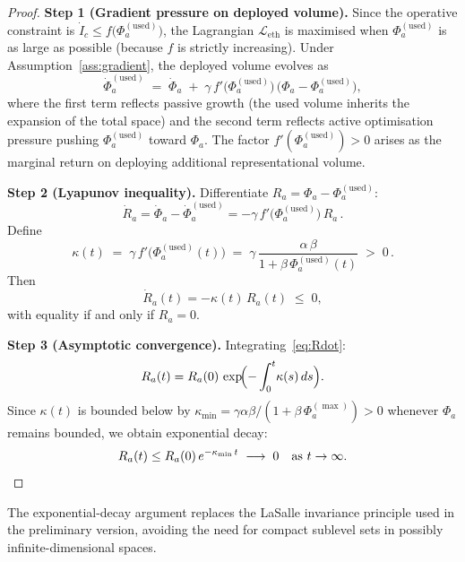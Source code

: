 \begin{proof}
\textbf{Step 1 (Gradient pressure on deployed volume).}
Since the operative constraint is
$\dot{I}_c\leq f\bigl(\Phi_a^{(\mathrm{used})}\bigr)$,
the Lagrangian $\mathcal{L}_{\mathrm{eth}}$ is maximised when
$\Phi_a^{(\mathrm{used})}$ is as large as possible (because $f$ is
strictly increasing).  Under Assumption~\ref{ass:gradient}, the
deployed volume evolves as
\begin{equation}
\label{eq:phi-used-dynamics}
    \dot{\Phi}_a^{(\mathrm{used})}
    \;=\;
    \dot{\Phi}_a
    \;+\;
    \gamma\,f'\!\bigl(\Phi_a^{(\mathrm{used})}\bigr)\,
    \bigl(\Phi_a - \Phi_a^{(\mathrm{used})}\bigr),
\end{equation}
where the first term reflects passive growth (the used volume inherits
the expansion of the total space) and the second term reflects
active optimisation pressure pushing $\Phi_a^{(\mathrm{used})}$
toward $\Phi_a$.  The factor $f'(\Phi_a^{(\mathrm{used})})>0$ arises
as the marginal return on deploying additional representational volume.

\textbf{Step 2 (Lyapunov inequality).}
Differentiate $R_a=\Phi_a-\Phi_a^{(\mathrm{used})}$:
\begin{equation}
    \dot{R}_a
    = \dot{\Phi}_a - \dot{\Phi}_a^{(\mathrm{used})}
    = -\gamma\,f'\!\bigl(\Phi_a^{(\mathrm{used})}\bigr)\,R_a\,.
\end{equation}
Define
\begin{equation}
    \kappa(t)
    \;=\;
    \gamma\,f'\!\bigl(\Phi_a^{(\mathrm{used})}(t)\bigr)
    \;=\;
    \gamma\,\frac{\alpha\,\beta}{1+\beta\,\Phi_a^{(\mathrm{used})}(t)}
    \;>\; 0\,.
\end{equation}
Then
\begin{equation}
\label{eq:Rdot}
    \dot{R}_a(t) = -\kappa(t)\,R_a(t) \;\leq\; 0,
\end{equation}
with equality if and only if $R_a=0$.

\textbf{Step 3 (Asymptotic convergence).}
Integrating~\eqref{eq:Rdot}:
\[
    R_a(t)
    = R_a(0)\,\exp\!\Bigl(-\int_0^t\!\kappa(s)\,ds\Bigr).
\]
Since $\kappa(t)$ is bounded below by
$\kappa_{\min}=\gamma\alpha\beta/(1+\beta\,\Phi_a^{(\max)})>0$
whenever $\Phi_a$ remains bounded, we obtain exponential decay:
\[
    R_a(t)\leq R_a(0)\,e^{-\kappa_{\min}\,t}\;\longrightarrow\; 0
    \quad\text{as }t\to\infty.
    \qedhere
\]
\end{proof}

\begin{remark}[Compactness]
The exponential-decay argument replaces the LaSalle invariance
principle used in the preliminary version, avoiding the need for
compact sublevel sets in possibly infinite-dimensional spaces.
\end{remark}



